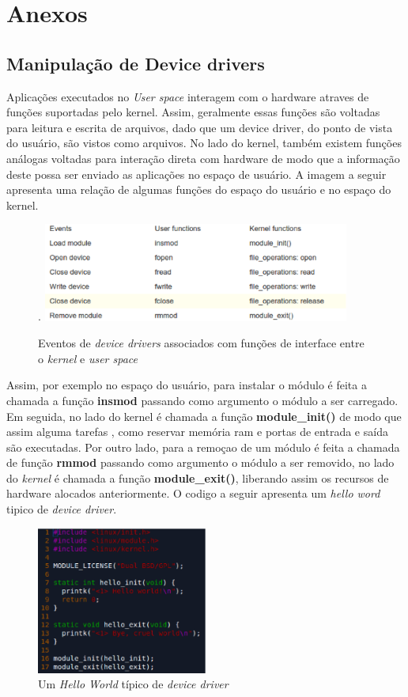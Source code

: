 \section{Anexos}
\subsection{Manipulação de Device drivers}
Aplicações executados no \textit{User space} interagem com o hardware atraves de funções suportadas
pelo kernel. Assim, geralmente essas funções são voltadas para leitura e escrita de arquivos, dado que um
device driver, do ponto de vista do usuário, são vistos como arquivos. No lado do kernel, também
existem funções análogas voltadas para interação direta com hardware de modo que a informação deste
possa ser enviado as aplicações no espaço de usuário. A imagem a seguir apresenta uma relação de algumas
funções do espaço do usuário e no espaço do kernel.

\begin{figure}[H]
  \centering
  \caption{ Eventos de \textit{device drivers} associados com funções de interface entre o \textit{kernel} e \textit{user space} }.
  \label{fig:usblinux}
  \includegraphics[width=0.9\textwidth]{figure/tabela.eps}
\end{figure}

Assim, por exemplo no espaço do usuário, para instalar o módulo é feita a chamada a função \textbf{insmod} passando
como argumento o módulo a ser carregado. Em seguida, no lado do kernel é chamada a função \textbf{module\_init()} de
modo que assim alguma tarefas , como reservar memória ram e portas de entrada e saída são executadas.
Por outro lado, para a remoçao de um módulo é feita a chamada de função \textbf{rmmod} passando como argumento
o módulo a ser removido, no lado do \textit{kernel} é chamada a função \textbf{module\_exit()}, liberando assim os recursos
de hardware alocados anteriormente. O codigo a seguir apresenta um \textit{hello word} tipico de \textit{device driver}.

\begin{figure}[H]
  \centering
  \caption{ Um \textit{Hello World} típico de \textit{device driver} }
  \label{fig:usblinux}
  \includegraphics[width=0.5\textwidth]{figure/codigo.eps}
\end{figure}

